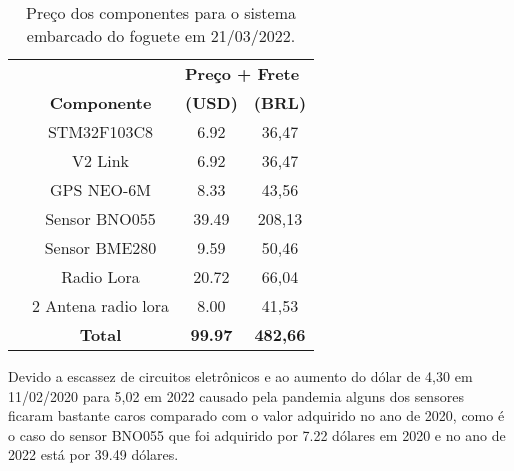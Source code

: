 \begin{table}[!thb]
	\centering
	\caption{Preço dos componentes para o sistema embarcado do foguete em 21/03/2022.}
    \begin{adjustbox}{max width={\textwidth},keepaspectratio}%
	\begin{tabular}{|ll|c|c|}
		\cline{3-4}
		\multicolumn{1}{c}{\textbf{}} & 
		\multicolumn{1}{c|}{\textbf{}} & 
		\multicolumn{2}{l|}{\textbf{Preço + Frete}} 
		\\ \cline{1-4}
		 & \multicolumn{1}{c|}{\textbf{Componente}} & \textbf{(USD)} & \textbf{(BRL)}
		 \\ \hline
		& \multicolumn{1}{c|}{STM32F103C8} & 6.92 & 36,47
		 \\ \hline
        & \multicolumn{1}{c|}{V2 Link} & 6.92 & 36,47
		 \\ \hline
        & \multicolumn{1}{c|}{ GPS NEO-6M } & 8.33 & 43,56
		 \\ \hline
        & \multicolumn{1}{c|}{Sensor BNO055} & 39.49 & 208,13
		 \\ \hline
        & \multicolumn{1}{c|}{Sensor BME280} & 9.59 & 50,46
		 \\ \hline
        & \multicolumn{1}{c|}{Radio Lora } & 20.72 & 66,04
		 \\ \hline
        & \multicolumn{1}{c|}{2 Antena radio lora} & 8.00 & 41,53
		 \\ \hline
		 
		 
		 
		 
		 & \multicolumn{1}{c|}{\textbf{Total}} & \textbf{99.97} & \textbf{482,66}
		 \\ \hline

	\end{tabular}
    \end{adjustbox}
    \label{tab:Orçamento1} 
\end{table}



Devido a escassez de circuitos eletrônicos e ao aumento do dólar de 4,30 em 11/02/2020 para 5,02  em 2022 causado pela pandemia alguns dos sensores ficaram bastante caros comparado com o valor adquirido no ano de 2020, como é o caso do sensor BNO055 que foi adquirido por 7.22 dólares em 2020 e no ano de 2022 está por 39.49 dólares.  












